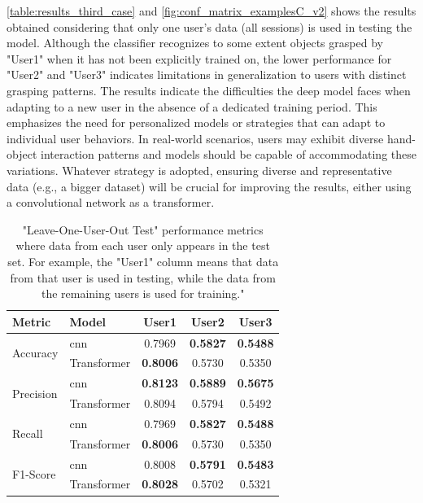 \autoref{table:results_third_case} and \autoref{fig:conf_matrix_examplesC_v2} shows the results obtained considering that only one user's data (all sessions) is used in testing the model. Although the classifier recognizes to some extent objects grasped by "User1" when it has not been explicitly trained on, the lower performance for "User2" and "User3" indicates limitations in generalization to users with distinct grasping patterns. The results indicate the difficulties the deep model faces when adapting to a new user in the absence of a dedicated training period. This emphasizes the need for personalized models or strategies that can adapt to individual user behaviors. In real-world scenarios, users may exhibit diverse hand-object interaction patterns and models should be capable of accommodating these variations. Whatever strategy is adopted, ensuring diverse and representative data (e.g., a bigger dataset) will be crucial for improving the results, either using a convolutional network as a transformer. 

\begin{table}[ht]
    \captionsetup{width=0.6\textwidth}
    \centering
    \caption{"Leave-One-User-Out Test" performance metrics where data from each user only appears in the test set. For example, the "User1" column means that data from that user is used in testing, while the data from the remaining users is used for training."}
    \label{table:results_third_case}
    \begin{tabular}{l|lccc}
        \toprule
        Metric & Model & User1 & User2 & User3 \\
        \midrule
        \multirow{2}{*}{Accuracy} & \acs{cnn} & 0.7969 & \textbf{0.5827} & \textbf{0.5488} \\
        & Transformer & \textbf{0.8006} & 0.5730 & 0.5350 \\
        \midrule
        \multirow{2}{*}{Precision} & \acs{cnn} & \textbf{0.8123} & \textbf{0.5889} & \textbf{0.5675} \\
        & Transformer & 0.8094 & 0.5794 & 0.5492 \\
        \midrule
        \multirow{2}{*}{Recall} & \acs{cnn} & 0.7969 & \textbf{0.5827} & \textbf{0.5488} \\
        & Transformer & \textbf{0.8006} & 0.5730 & 0.5350 \\
        \midrule
        \multirow{2}{*}{F1-Score} & \acs{cnn} & 0.8008 & \textbf{0.5791} & \textbf{0.5483} \\
        & Transformer & \textbf{0.8028} & 0.5702 & 0.5321 \\
        \bottomrule
    \end{tabular}
\end{table}

